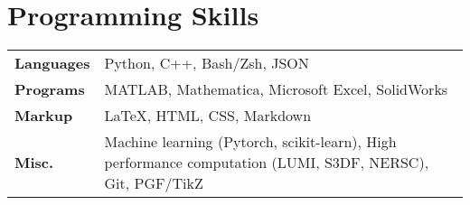 \documentclass[a4paper,11pt]{article}
\begin{document}
\vspace{-1.5em}
\section{Programming Skills}
\begin{tabularx}{\linewidth}{@{}l X@{}}
\textbf{Languages} & Python, C++, Bash/Zsh, JSON \\
\textbf{Programs} & MATLAB, Mathematica, Microsoft Excel, SolidWorks \\
\textbf{Markup} & \LaTeX, HTML, CSS, Markdown \\
\textbf{Misc.} & Machine learning (Pytorch, scikit-learn), High performance computation (LUMI, S3DF, NERSC), Git, PGF/TikZ
\end{tabularx}

\end{document}

